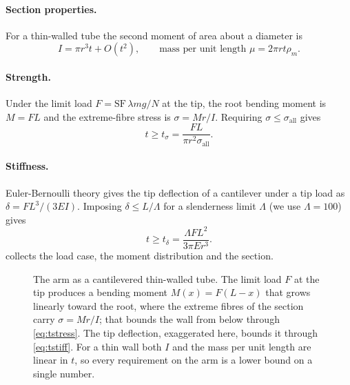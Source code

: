 \paragraph{Section properties.} For a thin-walled tube the second moment of
area about a diameter is
\begin{equation}
  I = \pi r^3 t + O(t^2), \qquad
  \text{mass per unit length } \mu = 2\pi r t \rho_m .
  \label{eq:tube}
\end{equation}

\paragraph{Strength.} Under the limit load $F = \mathrm{SF}\,\lambda m g/N$ at
the tip, the root bending moment is $M=FL$ and the extreme-fibre stress is
$\sigma = Mr/I$. Requiring $\sigma\le\sigma_{\mathrm{all}}$ gives
\begin{equation}
  t \ge t_{\sigma} = \frac{F L}{\pi r^2 \sigma_{\mathrm{all}}} .
  \label{eq:tstress}
\end{equation}

\paragraph{Stiffness.} Euler-Bernoulli theory gives the tip deflection of a
cantilever under a tip load as $\delta = FL^3/(3EI)$. Imposing
$\delta\le L/\Lambda$ for a slenderness limit $\Lambda$ (we use $\Lambda=100$)
gives
\begin{equation}
  t \ge t_{\delta} = \frac{\Lambda F L^{2}}{3\pi E r^{3}} .
  \label{eq:tstiff}
\end{equation}
 collects the load case, the moment distribution and the
section.

\begin{figure}[tbp]
\centering

\caption{The arm as a cantilevered thin-walled tube. The limit load $F$ at the
tip produces a bending moment $M(x)=F(L-x)$ that grows linearly toward the
root, where the extreme fibres of the section carry $\sigma=Mr/I$; that bounds
the wall from below through \cref{eq:tstress}. The tip deflection, exaggerated
here, bounds it through \cref{eq:tstiff}. For a thin wall both $I$ and the mass
per unit length are linear in $t$, so every requirement on the arm is a lower
bound on a single number.}
\label{fig:cantilever}
\end{figure}

